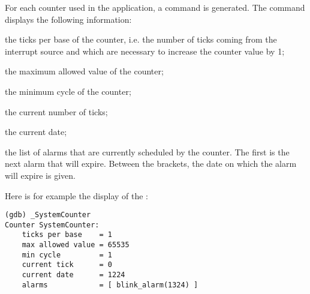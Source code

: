 For each counter used in the application, a command  is generated. The command displays the following information:

\begin{pitemize}
\item the ticks per base of the counter, i.e. the number of ticks coming from the interrupt source and which are necessary to increase the counter value by 1;
\item the maximum allowed value of the counter;
\item the minimum cycle of the counter;
\item the current number of ticks;
\item the current date;
\item the list of alarms that are currently scheduled by the counter. The first is the next alarm that will expire. Between the brackets, the date on which the alarm will expire is given.
\end{pitemize}

Here is for example the display of the :

\begin{lstlisting}
(gdb) _SystemCounter 
Counter SystemCounter:
	ticks per base    = 1
	max allowed value = 65535
	min cycle         = 1
	current tick      = 0
	current date      = 1224
	alarms            = [ blink_alarm(1324) ]
\end{lstlisting}
